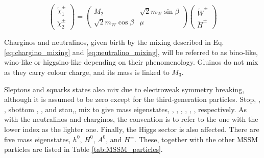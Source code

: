 				\begin{equation}
				\label{eq:chargino_mixing}
						\begin{pmatrix}  \tilde{\chi}^{\pm}_1 \\ \tilde{\chi}^{\pm}_2 \end{pmatrix}	
						= 
						\begin{pmatrix}
							M_2 & \sqrt{2} m_W \sin \beta \\
							\sqrt{2} m_W \cos \beta & \mu  
						\end{pmatrix}
						\begin{pmatrix}
							\tilde{W}^{\pm} \\
							\tilde{H}^{\pm}
						\end{pmatrix}
				\end{equation}

				Charginos and neutralinos, given birth by the mixing described in Eq. \ref{eq:chargino_mixing} and \ref{eq:neutralino_mixing}, will be referred to as bino-like, wino-like or higgsino-like depending on their phenomenology. Gluinos do not mix as they carry colour charge, and its mass is linked to $M_3$. 

				Sleptons and squarks states also mix due to electroweak symmetry breaking, although it is assumed to be zero except for the third-generation particles. Stop, \stopL, \stopR, sbottom \sbottomL, \sbottomR, and stau,\stauL, \stauR mix to give mass eigenstates, \stopone, \stoptwo, \sbottomone, \sbottomtwo, \stauone, \stautwo, respectively. As with the neutralinos and charginos, the convention is to refer to the one with the lower index as the lighter one. Finally, the Higgs sector is also affected. There are five mass eigenstates, $h^0$, $H^0$, $A^0$, and $H^{\pm}$. These, together with the other MSSM particles are listed in Table \ref{tab:MSSM_particles}. 

